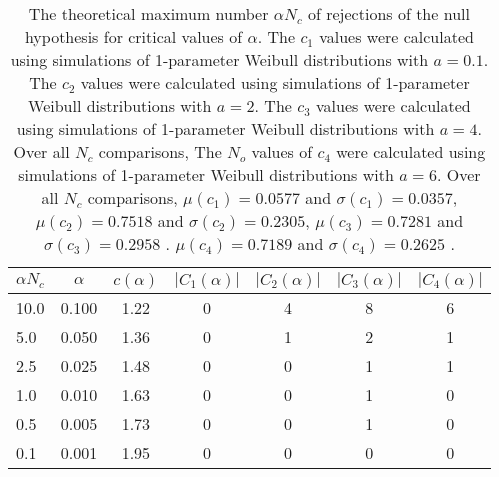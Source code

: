 \begin{table}[h!]
\begin{center}
\begin{tabular}{| l | c | c | c | c | c | c |}\hline
$\alpha N_c$ & $\alpha$ & $c(\alpha)$ & $|C_1(\alpha)|$ & $|C_2(\alpha)|$ & $|C_3(\alpha)|$ & $|C_4(\alpha)|$ \\\hline
10.0 & 0.100 & 1.22 & 0 & 4 & 8 & 6 \\\hline
5.0 & 0.050 & 1.36 & 0 & 1 & 2 & 1 \\\hline
2.5 & 0.025 & 1.48 & 0 & 0 & 1 & 1 \\\hline
1.0 & 0.010 & 1.63 & 0 & 0 & 1 & 0 \\\hline
0.5 & 0.005 & 1.73 & 0 & 0 & 1 & 0 \\\hline
0.1 & 0.001 & 1.95 & 0 & 0 & 0 & 0 \\\hline
\end{tabular}
\caption{The theoretical maximum number $\alpha N_c$ of rejections
of the null hypothesis for critical values of $\alpha$.
The $c_1$ values were calculated using simulations of 1-parameter Weibull distributions with $a=0.1$.
The $c_2$ values were calculated using simulations of 1-parameter Weibull distributions with $a=2$.
The $c_3$ values were calculated using simulations of 1-parameter Weibull distributions with $a=4$.
Over all $N_c$ comparisons,
The $N_o$ values of $c_4$ were calculated using simulations of
 1-parameter Weibull distributions with $a=6$.
Over all $N_c$ comparisons,
 $\mu(c_1)=0.0577$ and $\sigma(c_1)=0.0357$,
 $\mu(c_2)=0.7518$ and $\sigma(c_2)=0.2305$,
 $\mu(c_3)=0.7281$ and $\sigma(c_3)=0.2958$ .
 $\mu(c_4)=0.7189$ and $\sigma(c_4)=0.2625$ .
}
\end{center}
\end{table}